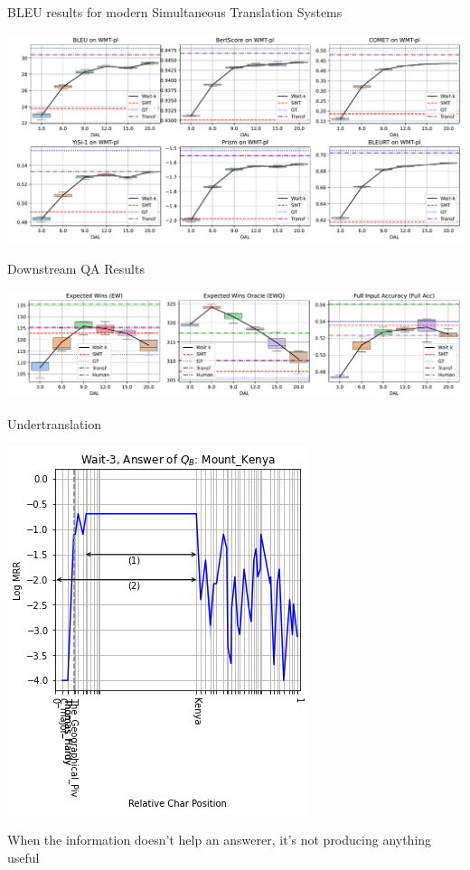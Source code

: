 \documentclass[compress]{beamer}
\begin{document}
\begin{frame}{BLEU results for modern Simultaneous Translation Systems}

  \begin{center}
  \includegraphics[width=0.9\linewidth]{simtrans/simQA/bleu_simqa}
\end{center}

\end{frame}

\begin{frame}{Downstream QA Results}

  \begin{center}
  \includegraphics[width=0.9\linewidth]{simtrans/simQA/qametrics_simqa}
\end{center}


\end{frame}


\begin{frame}{Undertranslation}
  \begin{center}
    \includegraphics[width=0.4\paperwidth]{simtrans/simQA/ex_undertranslation}
  \end{center}
When the information doesn't
help an answerer, it's not producing anything useful
\end{frame}
\end{document}
